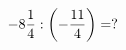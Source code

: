 \documentclass[preview]{standalone}
\begin{document}
\begin{align*}
-8 { 1 \over 4 }  :  \left( - { 11 \over 4 } \right)  =  ?
\end{align*}
\end{document}

